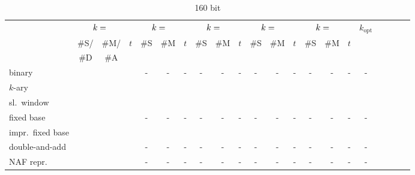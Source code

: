 \documentclass[11pt, a4paper, onecolumn, oneside]{scrartcl}
\begin{document}
\begin{landscape}
\begin{table}[h]
\hspace{-4cm}
\begin{tabular}{|l|c|c|c|c|c|c|c|c|c|c|c|c|c|c|c|c|c|c|c|c}
\hline
&\multicolumn{3}{c|}{$k = \rule{1em}{0ex}$}
&\multicolumn{3}{c|}{$k = \rule{1em}{0ex}$}
&\multicolumn{3}{c|}{$k = \rule{1em}{0ex}$}
&\multicolumn{3}{c|}{$k = \rule{1em}{0ex}$}
&\multicolumn{3}{c|}{$k = \rule{1em}{0ex}$}
&$k_{\mbox{opt}}$\\
        &{\small \#S/} &{\small \#M/} &{\small $t$}
        &{\small \#S} &{\small \#M} &{\small $t$}
        &{\small \#S} &{\small \#M} &{\small $t$}
        &{\small \#S} &{\small \#M} &{\small $t$}
        &{\small \#S} &{\small \#M} &{\small $t$} &\\
        &{\small \#D} &{\small \#A} &&&&&&&&&&&&&&\\
\hline\hline
binary &  &  & &-&-&- &-&-&- &-&-&- &-&-&- &-\\
\hline
$k$-ary &	&	&	&	&	& &	&	& &	&	& &	&	& &\\
\hline
sl.\ window &	&	&	&	&	& &	&	& &	&	& &	&	& &\\
\hline
fixed base & & & &-&-&- &-&-&- &-&-&- &-&-&- &-\\
\hline
impr.\ fixed base &	&	&	&	&	& &	&	& &	&	& &	&	& &\\
\hline\hline
double-and-add & & & &-&-&- &-&-&- &-&-&- &-&-&- &-\\
\hline
NAF repr. & & & &-&-&- &-&-&- &-&-&- &-&-&- &-\\
\hline
\end{tabular}
\caption{160 bit}


\end{table}
\end{landscape}
\end{document}
